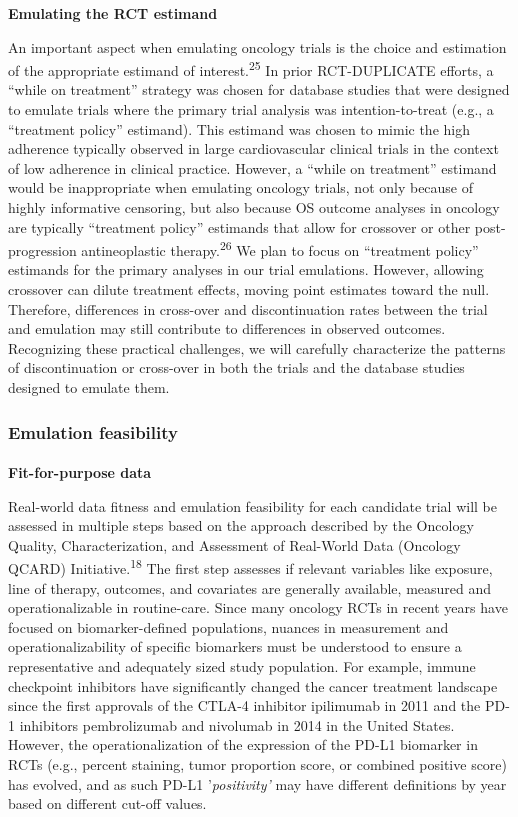 \documentclass[
  letterpaper,
  DIV=11,
  numbers=noendperiod]{scrartcl}
\makeatletter
\let\oldparagraph\paragraph
\renewcommand{\paragraph}{
    \@ifstar
      \xxxParagraphStar
      \xxxParagraphNoStar
  }
\newcommand{\xxxParagraphStar}[1]{\oldparagraph*{#1}\mbox{}}
\newcommand{\xxxParagraphNoStar}[1]{\oldparagraph{#1}\mbox{}}
\makeatother
\begin{document}
\textbf{Emulating the RCT estimand}

An important aspect when emulating oncology trials is the choice and
estimation of the appropriate estimand of interest.\textsuperscript{25}
In prior RCT-DUPLICATE efforts, a ``while on treatment'' strategy was
chosen for database studies that were designed to emulate trials where
the primary trial analysis was intention-to-treat (e.g., a ``treatment
policy'' estimand). This estimand was chosen to mimic the high adherence
typically observed in large cardiovascular clinical trials in the
context of low adherence in clinical practice. However, a ``while on
treatment'' estimand would be inappropriate when emulating oncology
trials, not only because of highly informative censoring, but also
because OS outcome analyses in oncology are typically ``treatment
policy'' estimands that allow for crossover or other post-progression
antineoplastic therapy.\textsuperscript{26} We plan to focus on
``treatment policy'' estimands for the primary analyses in our trial
emulations. However, allowing crossover can dilute treatment effects,
moving point estimates toward the null. Therefore, differences in
cross-over and discontinuation rates between the trial and emulation may
still contribute to differences in observed outcomes. Recognizing these
practical challenges, we will carefully characterize the patterns of
discontinuation or cross-over in both the trials and the database
studies designed to emulate them.

\subsubsection{Emulation feasibility}\label{emulation-feasibility}

\paragraph{\texorpdfstring{\textbf{Fit-for-purpose
data}}{Fit-for-purpose data}}\label{fit-for-purpose-data}

Real-world data fitness and emulation feasibility for each candidate
trial will be assessed in multiple steps based on the approach described
by the Oncology Quality, Characterization, and Assessment of Real-World
Data (Oncology QCARD) Initiative.\textsuperscript{18} The first step
assesses if relevant variables like exposure, line of therapy, outcomes,
and covariates are generally available, measured and operationalizable
in routine-care. Since many oncology RCTs in recent years have focused
on biomarker-defined populations, nuances in measurement and
operationalizability of specific biomarkers must be understood to ensure
a representative and adequately sized study population. For example,
immune checkpoint inhibitors have significantly changed the cancer
treatment landscape since the first approvals of the CTLA-4 inhibitor
ipilimumab in 2011 and the PD-1 inhibitors pembrolizumab and nivolumab
in 2014 in the United States. However, the operationalization of the
expression of the PD-L1 biomarker in RCTs (e.g., percent staining, tumor
proportion score, or combined positive score) has evolved, and as such
PD-L1 '\emph{positivity'} may have different definitions by year based
on different cut-off values.
\end{document}
